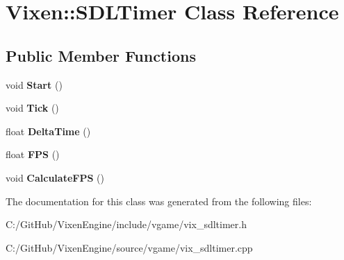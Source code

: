 \hypertarget{class_vixen_1_1_s_d_l_timer}{}\section{Vixen\+:\+:S\+D\+L\+Timer Class Reference}
\label{class_vixen_1_1_s_d_l_timer}
\subsection*{Public Member Functions}
\begin{DoxyCompactItemize}
\item 
\hypertarget{class_vixen_1_1_s_d_l_timer_a2f72d5d685ca8a7694e84b335846a43e}{}void {\bfseries Start} ()\label{class_vixen_1_1_s_d_l_timer_a2f72d5d685ca8a7694e84b335846a43e}

\item 
\hypertarget{class_vixen_1_1_s_d_l_timer_ada60d9b83fb7e3f37dc39637993fa6cb}{}void {\bfseries Tick} ()\label{class_vixen_1_1_s_d_l_timer_ada60d9b83fb7e3f37dc39637993fa6cb}

\item 
\hypertarget{class_vixen_1_1_s_d_l_timer_aced343a04fb791e71a02d99783929fc5}{}float {\bfseries Delta\+Time} ()\label{class_vixen_1_1_s_d_l_timer_aced343a04fb791e71a02d99783929fc5}

\item 
\hypertarget{class_vixen_1_1_s_d_l_timer_a1b278ab1495d34df9009effe94f46cef}{}float {\bfseries F\+P\+S} ()\label{class_vixen_1_1_s_d_l_timer_a1b278ab1495d34df9009effe94f46cef}

\item 
\hypertarget{class_vixen_1_1_s_d_l_timer_a535c36263c9361c632801ccb964a3671}{}void {\bfseries Calculate\+F\+P\+S} ()\label{class_vixen_1_1_s_d_l_timer_a535c36263c9361c632801ccb964a3671}

\end{DoxyCompactItemize}


The documentation for this class was generated from the following files\+:\begin{DoxyCompactItemize}
\item 
C\+:/\+Git\+Hub/\+Vixen\+Engine/include/vgame/vix\+\_\+sdltimer.\+h\item 
C\+:/\+Git\+Hub/\+Vixen\+Engine/source/vgame/vix\+\_\+sdltimer.\+cpp\end{DoxyCompactItemize}

